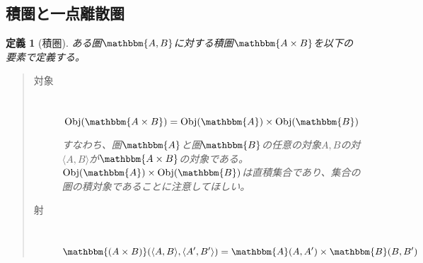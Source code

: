\documentclass[dvipdfmx]{jsarticle}
\newcommand{\cat}[1]{\mathbbm{#1}}
\newcommand{\tuple}[1]{\langle #1\rangle}
\newcommand{\obj}[1]{\mathrm{Obj}(\cat{#1})}
\newcommand{\arset}[3]{\cat{#1}(#2,#3)}
\newtheorem{define}{定義}[section]
\numberwithin{proof}{subsection}
\numberwithin{prop}{subsection}
\numberwithin{define}{subsection}
\begin{document}
	\subsection{積圏と一点離散圏}
	\begin{define}[積圏]
		ある圏$\cat{A,B}$に対する積圏$\cat{A\times B}$を以下の要素で定義する。
		\begin{quote}
			\begin{description}
				\item[対象]　\[\obj{A\times B}=\obj{A}\times\obj{B}\]

				すなわち、圏$\cat{A}$と圏$\cat{B}$の任意の対象$A,B$の対$\tuple{A,B}$が$\cat{A\times B}$の対象である。
				$\obj{A}\times\obj{B}$は直積集合であり、集合の圏の積対象であることに注意してほしい。
				\item[射]　\[\arset{(A\times B)}{\tuple{A,B}}{\tuple{A',B'}}=\arset{A}{A}{A'}\times\arset{B}{B}{B'}\]


\end{description}
\end{quote}
\end{define}
\end{document}
